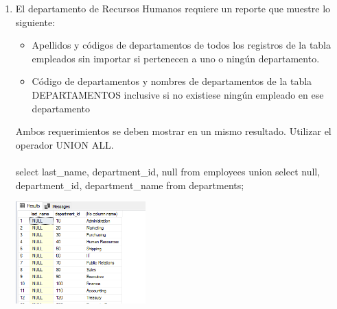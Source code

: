 \begin{enumerate}[1.]
	\item El departamento de Recursos Humanos requiere un reporte que muestre lo siguiente:

	\begin{itemize}
		\item Apellidos y c\'odigos de departamentos de todos los registros de la tabla empleados sin importar si pertenecen a uno o ningún departamento.
		\item C\'odigo de departamentos y nombres de departamentos de la tabla DEPARTAMENTOS inclusive si no existiese ningún empleado en ese departamento
	\end{itemize}
	Ambos requerimientos se deben mostrar en un mismo resultado. Utilizar el operador UNION ALL.
	\\
	\\select last\_name, department\_id, null from employees union select null, department\_id, department\_name from departments;

	\begin{center}
	\includegraphics[width=5cm]{./Imagenes/ejercicio10-5} 
	\end{center}

\end{enumerate}